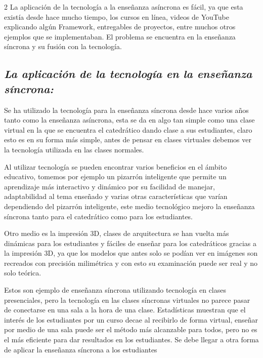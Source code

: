 \documentclass[12pt,spanish,Letterpaper,openany]{book}
\newcommand{\spacethreemilis}{\vspace{3mm}}
\begin{document}
\begin {multicols}{2}
La aplicación de la tecnología a la enseñanza asíncrona es fácil, ya que esta existía desde
hace mucho tiempo, los cursos en línea, videos de YouTube explicando algún Framework,
entregables de proyectos, entre muchos otros ejemplos que se implementaban. El problema se
encuentra en la enseñanza síncrona y su fusión con la tecnología.

\spacethreemilis

\hypertarget{la-aplicaciuxf3n-de-la-tecnologuxeda-en-la-enseuxf1anza-suxedncrona}{%
\subsection{\texorpdfstring{\emph{La aplicación de la tecnología en la enseñanza síncrona:}}{La aplicación de la tecnología en la enseñanza síncrona:}}\label{la-aplicaciuxf3n-de-la-tecnologuxeda-en-la-enseuxf1anza-suxedncrona}}

Se ha utilizado la tecnología para la enseñanza síncrona desde hace varios años tanto
como la enseñanza asíncrona, esta se da en algo tan simple como una clase virtual en la que se
encuentra el catedrático dando clase a sus estudiantes, claro esto es en su forma más simple,
antes de pensar en clases virtuales debemos ver la tecnología utilizada en las clases normales.

Al utilizar tecnología se pueden encontrar varios beneficios en el ámbito educativo,
tomemos por ejemplo un pizarrón inteligente que permite un aprendizaje más interactivo y
dinámico por su facilidad de manejar, adaptabilidad al tema enseñado y varias otras
características que varían dependiendo del pizarrón inteligente, este medio tecnológico mejoro la
enseñanza síncrona tanto para el catedrático como para los estudiantes.

Otro medio es la impresión 3D, clases de arquitectura se han vuelta más dinámicas para
los estudiantes y fáciles de enseñar para los catedráticos gracias a la impresión 3D, ya que los
modelos que antes solo se podían ver en imágenes son recreados con precisión milimétrica y con
esto su examinación puede ser real y no solo teórica.

Estos son ejemplo de enseñanza síncrona utilizando tecnología en clases presenciales,
pero la tecnología en las clases síncronas virtuales no parece pasar de conectarse en una sala a la
hora de una clase. Estadísticas muestran que el interés de los estudiantes por un curso decae al
recibirlo de forma virtual, enseñar por medio de una sala puede ser el método más alcanzable
para todos, pero no es el más eficiente para dar resultados en los estudiantes. Se debe llegar a
otra forma de aplicar la enseñanza síncrona a los estudiantes


\end{multicols}
\end{document}
